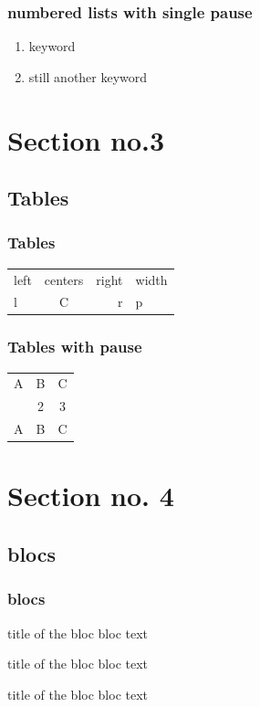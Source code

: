 \documentclass[hyperref={pdfpagelabels=false},spanish]{beamer}
\begin{document}
\begin{frame}
\frametitle{numbered lists with single pause}
\begin{enumerate}
\item keyword  \pause 
\item still another keyword
\end{enumerate}
\end{frame}

\section{Section no.3} 
\subsection{Tables}
\begin{frame}
\frametitle{Tables}
\begin{tabular}{|l|c|r|p{1.5 cm }|}
\hline
left & centers & right & width \\
l & C & r & p \\
\hline
\end{tabular}
\end{frame}


\begin{frame}
\frametitle{Tables with pause}
\begin{tabular}{c c c}
A & B & C \\ 
\pause 
1 & 2 & 3 \\  
\pause 
A & B & C \\ 
\end{tabular} 
\end{frame}


\section{Section no. 4}
\subsection{blocs}
\begin{frame}
\frametitle{blocs}

\begin{block}{title of the bloc}
bloc text
\end{block}

\begin{exampleblock}{title of the bloc}
bloc text
\end{exampleblock}


\begin{alertblock}{title of the bloc}
bloc text
\end{alertblock}
\end{frame}
\end{document}
